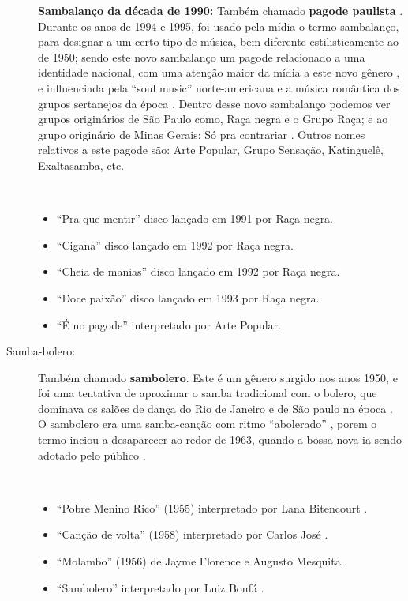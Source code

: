 \begin{description}
\textbf{Sambalanço da década de 1990:} Também chamado \textbf{pagode paulista}  \cite[pp. 130]{perna2002samba}.
Durante os anos de 1994 e 1995, 
foi usado pela mídia o termo sambalanço, para designar a um certo tipo de música, 
bem diferente estilisticamente ao de 1950;
sendo este novo sambalanço um pagode relacionado a uma identidade nacional,
com uma atenção maior da mídia a este novo gênero \cite[pp. 127]{vianna1999bezerra}, 
e influenciada pela ``soul music'' norte-americana e a música romântica dos grupos sertanejos da época  \cite[pp. 130-131]{perna2002samba}.
Dentro desse novo sambalanço podemos ver grupos originários de São Paulo como, Raça negra e o Grupo Raça;
e ao grupo originário de Minas Gerais: Só pra contrariar \cite[pp. 130]{perna2002samba} \cite[pp. 128]{vianna1999bezerra}.
Outros nomes relativos a este pagode são: Arte Popular, Grupo Sensação, Katinguelê, Exaltasamba, etc.

\begin{example} ~

\begin{itemize}
\item ``Pra que mentir'' disco lançado em 1991 por Raça negra.
\item ``Cigana'' disco lançado em 1992 por Raça negra.
\item ``Cheia de manias'' disco lançado em 1992 por Raça negra.
\item ``Doce paixão'' disco lançado em 1993 por Raça negra.
\item ``É no pagode'' interpretado por Arte Popular.
\end{itemize}
\end{example}



\item[Samba-bolero:] 
Também chamado \textbf{sambolero}.
Este é um gênero surgido nos anos 1950, e foi uma tentativa de aproximar o samba tradicional com o bolero,
que dominava os salões de dança do Rio de Janeiro e de São paulo na época \cite[pp. 291]{dourado2004dicionario}.
O sambolero era uma samba-canção com ritmo ``abolerado'' \cite[pp. 685]{marcondes1977enciclopediav2},
porem o termo inciou a desaparecer ao redor de 1963, 
quando a bossa nova ia sendo adotado pelo público \cite[pp. 84]{biblioteca2006cultura}.

\begin{example} ~

\begin{itemize}
\item ``Pobre Menino Rico'' (1955) interpretado  por Lana Bitencourt \cite[pp. 5]{pobremeninorico}.
\item ``Canção de volta'' (1958) interpretado por Carlos José \cite[pp. 36]{carlosjose}.
\item ``Molambo'' (1956) de Jayme Florence e Augusto Mesquita \cite[pp. 481, 516]{faour2001bastidores}.
\item ``Sambolero'' interpretado por Luiz Bonfá \cite[pp. 49]{sambolero}.
\end{itemize}
\end{example}



\end{description}
